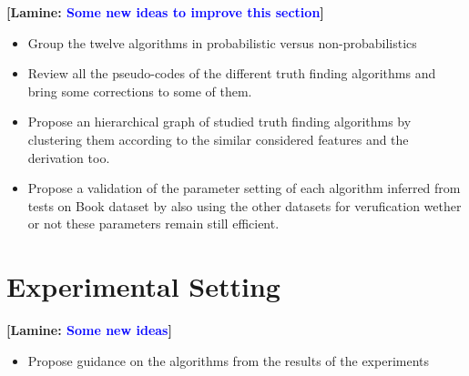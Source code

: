 \documentclass{vldb}
\newcommand{\lamine}[1]{\textbf{[Lamine: \textcolor{blue}{#1}]}}
\begin{document}
\lamine{Some new ideas to improve this section}
\begin{itemize}
\item Group the twelve algorithms in probabilistic versus non-probabilistics
 \item Review all the pseudo-codes of the different truth finding 
 algorithms and bring some corrections to some of them.
 \item Propose an hierarchical graph of studied truth finding algorithms
 by clustering them according to the similar considered features and the 
 derivation too.
 \item Propose a validation of the parameter setting of each algorithm
 inferred from tests on Book dataset by also using the other datasets
 for verufication wether or not these parameters remain still efficient.
\end{itemize}

\section{Experimental Setting}
\lamine{Some new ideas}
\begin{itemize}
 \item Propose guidance  on the algorithms from the results of the experiments
\end{itemize}
\end{document}
